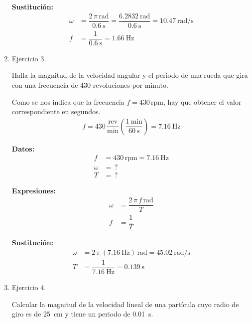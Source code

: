 \documentclass[14pt]{extarticle}
\begin{document}
\begin{enumerate}
\textbf{Sustitución:}
\begin{align*}
\omega &= \dfrac{2 \, \pi \, \unit{\radian}}{\SI{0.6}{\second}} = \dfrac{\SI{6.2832}{\radian}}{\SI{0.6}{\second}} = \SI[per-mode=fraction]{10.47}{\radian\per\second} \\[0.5em]
f &= \dfrac{1}{\SI{0.6}{\second}} = \SI{1.66}{\hertz}
\end{align*}
\item Ejercicio 3.

Halla la magnitud de la velocidad angular y el periodo de una rueda que gira con una frecuencia de \num{430} revoluciones por minuto.

Como se nos indica que la frecuencia $f = 430 \, \text{rpm}$, hay que obtener el valor correspondiente en segundos.
\begin{align*}
f = 430 \, \dfrac{\text{rev}}{\unit{\minute}} \left( \dfrac{\SI{1}{\minute}}{\SI{60}{\second}} \right) = \SI{7.16}{\hertz}
\end{align*}

\vspace*{0.5cm}
\begin{minipage}[t]{0.4\linewidth}
\textbf{Datos:}
\begin{align*}
f &= \num{430} \, \text{rpm} = \SI{7.16}{\hertz} \\
\omega &= \, ? \\
T &= \, ?
\end{align*}
\end{minipage}
\begin{minipage}[t]{0.4\linewidth}
\textbf{Expresiones:}
\begin{align*}
\omega &= \dfrac{2 \, \pi \, f \, \unit{\radian}}{T} \\[0.5em]
f &= \dfrac{1}{T}
\end{align*}
\end{minipage}

\textbf{Sustitución:}
\begin{align*}
\omega &= 2 \, \pi \, \left( \SI{7.16}{\hertz} \right) \, \unit{\radian}= \SI[per-mode=fraction]{45.02}{\radian\per\second} \\[0.5em]
T &= \dfrac{1}{\SI{7.16}{\hertz}} = \SI{0.139}{\second}
\end{align*}
\item Ejercicio 4.

Calcular la magnitud de la velocidad lineal de una partícula cuyo radio de giro es de \SI{25}{\centi\meter} y tiene un periodo de \SI{0.01}{\second}.


\end{enumerate}
\end{document}
